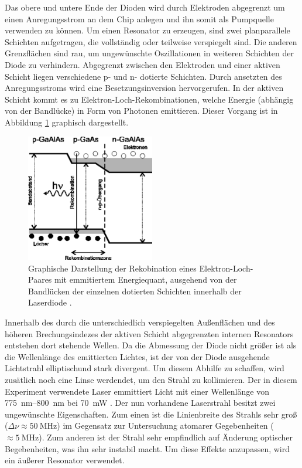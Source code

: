 Das obere und untere Ende der Dioden wird durch Elektroden abgegrenzt um einen
Anregungsstrom an dem Chip anlegen und ihn somit als Pumpquelle verwenden zu
können. Um einen Resonator zu erzeugen, sind zwei planparallele Schichten
aufgetragen, die vollständig oder teilweise verspiegelt sind. Die anderen
Grenzflächen sind rau, um ungewünschte Oszillationen in weiteren Schichten der
Diode zu verhindern. Abgegrenzt zwischen den Elektroden und einer aktiven Schicht
liegen verschiedene p- und n- dotierte Schichten. Durch ansetzten des
Anregungsstroms wird eine Besetzungsinversion hervorgerufen. In der aktiven
Schicht kommt es zu Elektron-Loch-Rekombinationen, welche Energie (abhängig von der
Bandlücke) in Form von Photonen emittieren. Dieser Vorgang ist in Abbildung
\ref{fig:recombition} graphisch dargestellt.
\begin{figure}[htb]
  \centering
  \includegraphics[width=0.5\textwidth]{images/recombition.pdf}
  \caption{Graphische Darstellung der Rekobination eines Elektron-Loch-Paares mit
  emmitiertem Energiequant, ausgehend von der Bandlücken der einzelnen dotierten
  Schichten innerhalb der Laserdiode \cite{recomb}.}
  \label{fig:recombition}
\end{figure}

Innerhalb des durch die unterschiedlich
verspiegelten Außenflächen und des höheren Brechungsindezes der aktiven Schicht
abgegrenzten internen Resonators entstehen dort stehende Wellen. Da die Abmessung
der Diode nicht größer ist als die Wellenlänge des emittierten Lichtes, ist der
von der Diode ausgehende Lichtstrahl elliptischund stark divergent. Um diesem
Abhilfe zu schaffen, wird zusätlich noch eine Linse werdendet, um den Strahl zu
kollimieren.
Der in diesem Experiment verwendete Laser emmittiert Licht
mit einer Wellenlänge von \SIrange{775}{800}{\nano\meter} bei \SI{70}{\milli\watt}
\cite{Sanyo}.
Der nun vorhandene Laserstrahl besitzt zwei ungewünschte Eigenschaften. Zum einen
ist die Linienbreite des Strahls sehr groß ($\Delta\nu \approx \SI{50}{\mega\hertz}$)
im Gegensatz zur Untersuchung atomarer Gegebenheiten ($ \approx \SI{5}{\mega\hertz}$).
Zum anderen ist der Strahl sehr empfindlich auf Änderung optischer Begebenheiten,
was ihn sehr instabil macht. Um diese Effekte anzupassen, wird ein äußerer
Resonator verwendet.

